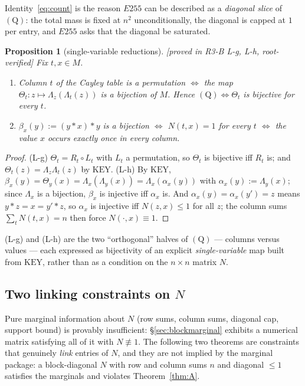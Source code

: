 \documentclass[11pt]{article}
\theoremstyle{plain}
\newtheorem{proposition}[theorem]{Proposition}
\theoremstyle{definition}
\theoremstyle{remark}
\numberwithin{equation}{section}
\newcommand{\op}{\mathbin{*}}
\newcommand{\statusbox}[1]{{\small\sloppy\textsf{[#1]}}}
\newcommand{\PROVED}[1]{\statusbox{proved in #1, root-verified}}
\begin{document}
Identity~\eqref{eq:count} is the reason $E255$ can be described as a \emph{diagonal slice} of
$(\mathrm{Q})$: the total mass is fixed at $n^2$ unconditionally, the diagonal is capped at
$1$ per entry, and $E255$ asks that the diagonal be saturated.

\begin{proposition}[single-variable reductions]\label{prop:LgLh}
\PROVED{R3-B L-g, L-h}
Fix $t,x\in M$.
\begin{enumerate}
\item[(L-g)] Column $t$ of the Cayley table is a permutation $\iff$ the map
$\Theta_t: z\mapsto \Lambda_z(\Lambda_t(z))$ is a bijection of $M$. Hence
$(\mathrm{Q}) \iff \Theta_t$ is bijective for every $t$.
\item[(L-h)] $\beta_x(y) := (y\op x)\op y$ is a bijection $\iff$ $N(t,x) = 1$ for every $t$
$\iff$ the value $x$ occurs exactly once in every column.
\end{enumerate}
\end{proposition}

\begin{proof}
(L-g) $\Theta_t = R_t\circ L_t$ with $L_t$ a permutation, so $\Theta_t$ is bijective iff
$R_t$ is; and $\Theta_t(z) = \Lambda_z\Lambda_t(z)$ by $\mathrm{KEY}$.
(L-h) By $\mathrm{KEY}$, $\beta_x(y) = \Theta_y(x) = \Lambda_x(\Lambda_y(x)) =
\Lambda_x(\alpha_x(y))$ with $\alpha_x(y) := \Lambda_y(x)$; since $\Lambda_x$ is a bijection,
$\beta_x$ is injective iff $\alpha_x$ is. And $\alpha_x(y) = \alpha_x(y') = z$ means
$y\op z = x = y'\op z$, so $\alpha_x$ is injective iff $N(z,x)\le 1$ for all $z$; the column
sums $\sum_t N(t,x) = n$ then force $N(\cdot,x)\equiv 1$.
\end{proof}

(L-g) and (L-h) are the two ``orthogonal'' halves of $(\mathrm{Q})$ --- columns versus values
--- each expressed as bijectivity of an explicit \emph{single-variable} map built from
$\mathrm{KEY}$, rather than as a condition on the $n\times n$ matrix $N$.

\subsection{Two linking constraints on $N$}

Pure marginal information about $N$ (row sums, column sums, diagonal cap, support bound) is
provably insufficient: \S\ref{sec:blockmarginal} exhibits a numerical matrix satisfying all
of it with $N\not\equiv 1$. The following two theorems are constraints that genuinely
\emph{link} entries of $N$, and they are not implied by the marginal package: a
block-diagonal $N$ with row and column sums $n$ and diagonal $\le 1$ satisfies the marginals
and violates Theorem~\ref{thm:A}.
\end{document}
